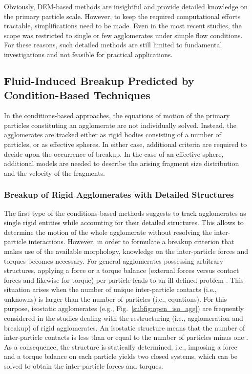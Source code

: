 Obviously, DEM-based methods are insightful and provide
detailed
knowledge on the primary particle scale. However, to keep the required
computational efforts tractable, simplifications need to be made. Even
in the most recent studies, the scope was restricted to single or few
agglomerates under simple flow conditions. For these reasons, such
detailed methods are still limited to fundamental investigations and
not feasible for practical applications.

\subsection{Fluid-Induced  Breakup Predicted by Condition-Based
Techniques}

In the conditions-based approaches, the equations of motion of the
primary
particles constituting an agglomerate are not individually solved.
Instead, the agglomerates are tracked either as rigid bodies
consisting of a number of particles, or as effective spheres. In
either case, additional criteria are required to decide upon the
occurrence of breakup. In the case of an effective sphere, additional
models are needed to describe the arising fragment size distribution
and the velocity of the fragments.

\subsubsection{Breakup of Rigid Agglomerates with Detailed Structures}
\label{sec:break_fluid_rigid}

The first type of the conditions-based methods suggests to track
agglomerates as single rigid entities while accounting for their
detailed structures. This allows to determine the motion of the whole
agglomerate without resolving the inter-particle interactions.
However, in order to formulate a breakup criterion that makes use of
the available morphology, knowledge on the inter-particle forces and
torques becomes necessary. For general agglomerates possessing
arbitrary structures, applying a force or a torque balance (external
forces versus contact forces and likewise for torque) per particle
leads to an ill-defined problem \citep{derksen2010potential}. This
situation arises when the number of unique inter-particle contacts
(i.e., unknowns) is larger than the number of particles (i.e.,
equations).  For this purpose, isostatic agglomerates (e.g.,
Fig.~\ref{subfig:open_iso_agg}) are frequently considered in the
studies dealing with the restructuring (i.e., agglomeration and
breakup) of rigid agglomerates.  An isostatic structure means that the
number of inter-particle contacts is less than or equal to the number
of particles minus one \citep{schutte2018formation}.  As a
consequence, the structure is statically determined, i.e., imposing a
force and a torque balance on each particle yields two closed systems,
which can be solved to obtain the inter-particle forces and torques. 
\newline 

